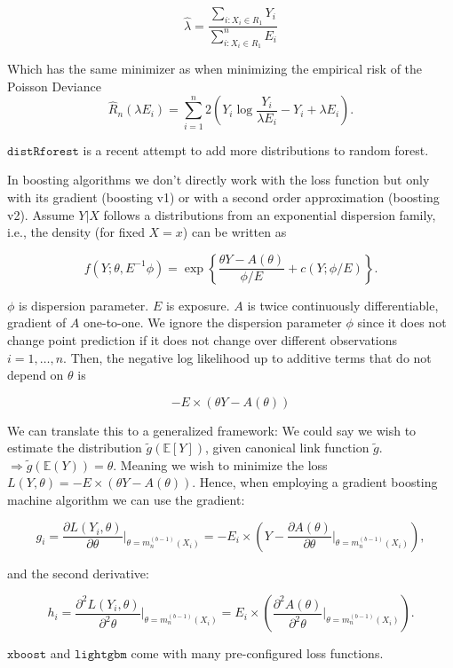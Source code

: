 \documentclass[
]{book}
\begin{document}
\[
\hat \lambda = \frac{\sum_{i: X_i\in R_1}  Y_i}{\sum_{i: X_i\in R_1} ^n E_i}
\]

Which has the same minimizer as when minimizing the empirical risk of the Poisson Deviance
\[
\hat R_n(\lambda E_i)=\sum_{i=1}^n 2\left(Y_i\log {\frac {Y_i}{\lambda E_i }}-Y_i+\lambda E_i \right).
\]

\href{https://github.com/henckr/distRforest}{\(\texttt{distRforest}\)} is a recent attempt to add more distributions to random forest.

In boosting algorithms we don't directly work with the loss function but only with its gradient (boosting v1) or with a second order approximation (boosting v2). Assume \(Y|X\) follows a distributions from an exponential dispersion family, i.e., the density (for fixed \(X=x\)) can be written as

\[
f\left(Y ; \theta, E^{-1} \phi\right)=\exp \left\{ \frac{\theta Y-A(\theta)}{\phi/E}+c\left(Y ; \phi/E\right)\right\}.
\]

\(\phi\) is dispersion parameter. \(E\) is exposure. \(A\) is twice continuously differentiable, gradient of \(A\) one-to-one. We ignore the dispersion parameter \(\phi\) since it does not change point prediction if it does not change over different observations \(i=1,\dots,n\). Then, the negative log likelihood up to additive terms that do not depend on \(\theta\) is

\[
- E\times(\theta Y - A(\theta))
\]

We can translate this to a generalized framework: We could say we wish to estimate the distribution \(\tilde g (\mathbb E[Y])\), given canonical link function \(\tilde g\). \(\Rightarrow \tilde g(\mathbb E(Y))=\theta\). Meaning we wish to minimize the loss \(L(Y,\theta)= - E\times(\theta Y - A(\theta)).\) Hence, when employing a gradient boosting machine algorithm we can use the gradient:

\[
g_i= \frac{\partial  L(Y_i,\theta)}{\partial \theta} \Bigr\rvert_{\theta=m_n^{(b-1)}(X_i)}=-E_i\times \left(Y-  \frac{\partial  A(\theta)}{\partial \theta} \Bigr\rvert_{\theta=m_n^{(b-1)}(X_i)}\right),
\]

and the second derivative:

\[
h_i= \frac{\partial^2  L(Y_i,\theta)}{\partial^2 \theta} \Bigr\rvert_{\theta=m_n^{(b-1)}(X_i)}=E_i\times \left(  \frac{\partial^2  A(\theta)}{\partial^2 \theta} \Bigr\rvert_{\theta=m_n^{(b-1)}(X_i)}\right).
\]

\(\texttt{xboost}\) and \(\texttt{lightgbm}\) come with many pre-configured loss functions.
\end{document}

